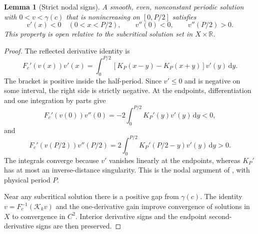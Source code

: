 \documentclass[11pt,a4paper]{article}
\newtheorem{lemma}[theorem]{Lemma}
\theoremstyle{remark}
\newcommand{\R}{\mathbb R}
\newcommand{\K}{\mathcal K}
\newcommand{\dd}{\,\mathrm d}
\begin{document}
\begin{lemma}[Strict nodal signs]\label{lem:nodal}
A smooth, even, nonconstant periodic solution with $0<v<\gamma(c)$
that is nonincreasing on $[0,P/2]$ satisfies
\[
 v'(x)<0\quad(0<x<P/2),\qquad v''(0)<0,
 \qquad v''(P/2)>0.
\]
This property is open relative to the subcritical solution set in
$X\times\R$.
\end{lemma}
\begin{proof}
The reflected derivative identity is
\begin{equation}\label{eq:reflected-derivative}
 F_c'(v(x))v'(x)=\int_0^{P/2}
       [K_P(x-y)-K_P(x+y)]v'(y)\dd y.
\end{equation}
The bracket is positive inside the half-period. Since $v'\le0$ and is
negative on some interval, the right side is strictly negative. At the
endpoints, differentiation and one integration by parts give
\[
 F_c'(v(0))v''(0)=-2\int_0^{P/2}K_P'(y)v'(y)\dd y<0,
\]
and
\[
 F_c'(v(P/2))v''(P/2)
       =2\int_0^{P/2}K_P'(P/2-y)v'(y)\dd y>0.
\]
The integrals converge because $v'$ vanishes linearly at the endpoints,
whereas $K_P'$ has at most an inverse-distance singularity. This is the
nodal argument of \cite[Theorem 4.2]{EJC}, with physical period $P$.

Near any subcritical solution there is a positive gap from $\gamma(c)$.
The identity $v=F_c^{-1}(\K_kv)$ and the one-derivative gain improve
convergence of solutions in $X$ to convergence in $C^2$. Interior derivative
signs and the endpoint second-derivative signs are then preserved.
\end{proof}
\end{document}
